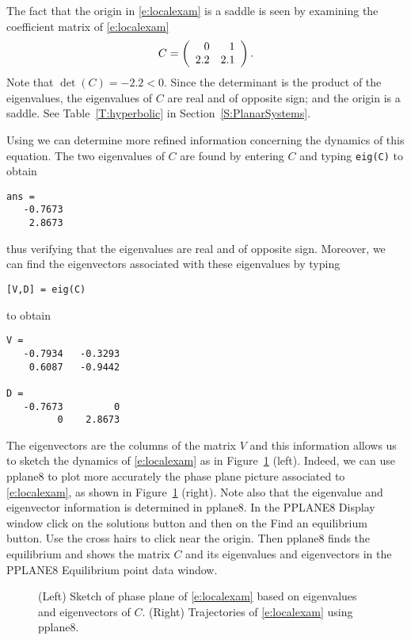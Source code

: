 \documentclass{ximera}
\begin{document}
The fact that the origin in \eqref{e:localexam} is a saddle is seen by 
examining the coefficient matrix of \eqref{e:localexam}
\[
C = \left(\begin{array}{rr} 0 & 1\\ 2.2 &2.1\end{array}\right).
\]
Note that $\det(C)=-2.2<0$.  Since the determinant is the product 
of the eigenvalues, the eigenvalues of $C$ are real and of opposite 
sign; and the origin is a saddle.  See Table~\ref{T:hyperbolic} in 
Section~\ref{S:PlanarSystems}.

Using \Matlab we can determine more refined information
concerning the dynamics of this equation.  The two eigenvalues
of $C$ are found by entering $C$ and typing {\tt eig(C)}
to obtain
\begin{verbatim}
ans = 
   -0.7673
    2.8673
\end{verbatim}
thus verifying that the eigenvalues are real and of opposite
sign.  Moreover, we can find the eigenvectors
 associated with these eigenvalues by typing
\begin{verbatim}
[V,D] = eig(C)
\end{verbatim}
to obtain
\begin{verbatim}
V = 
   -0.7934   -0.3293
    0.6087   -0.9442
 
D =
   -0.7673         0
         0    2.8673
\end{verbatim} 
The eigenvectors are the columns of the matrix $V$ and this 
information allows us to sketch the dynamics of
\eqref{e:localexam} as in Figure~\ref{F:local} (left).  Indeed, we
can use {\sf pplane8} to plot more accurately the phase plane
picture associated to \eqref{e:localexam}, as shown in
Figure~\ref{F:local} (right).  Note also that the eigenvalue and eigenvector
information is determined in {\sf pplane8}.  In the {\sf PPLANE8 Display}
window click on the {\sf solutions} button and then on the {\sf Find an 
equilibrium} button.  Use the cross hairs to click near the origin.  Then 
{\sf pplane8} finds the equilibrium and shows the matrix $C$ and its eigenvalues
and eigenvectors in the {\sf PPLANE8 Equilibrium point data} window.

\begin{figure}[htb]
           \centerline{%
           }
           \caption{(Left) Sketch of phase plane of \protect\eqref{e:localexam} 
	based on eigenvalues and eigenvectors of $C$. (Right) Trajectories 
	of \protect\eqref{e:localexam} using {\sf pplane8}.}
           \label{F:local}
\end{figure}
\end{document}
